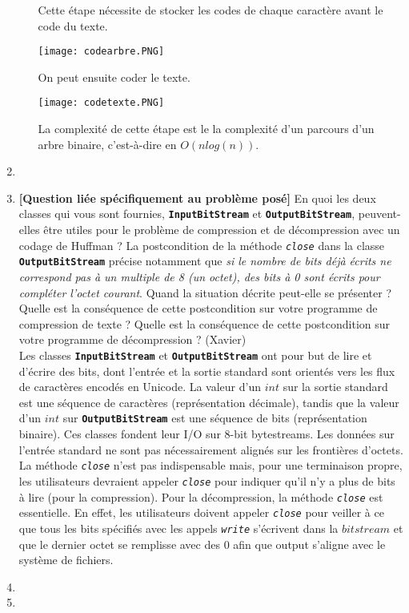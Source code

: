 \documentclass[11pt]{article}
\begin{document}
\begin{enumerate}
\begin{enumerate}
\begin{center}
\end{center}
Cette étape nécessite de stocker les codes de chaque caractère avant le code du texte.
\begin{center}
    \texttt{[image: codearbre.PNG]}
\end{center}
On peut ensuite coder le texte.
\begin{center}
    \texttt{[image: codetexte.PNG]}
\end{center}
La complexité de cette étape est le la complexité d'un parcours d'un arbre binaire, c'est-à-dire en $O(n log(n))$.\\
\end{enumerate}

\item

\item \textbf{[Question liée spécifiquement au problème posé]} En quoi les deux classes qui
vous sont fournies, \texttt{\textbf{InputBitStream}} et \texttt{\textbf{OutputBitStream}}, peuvent-elles
être utiles pour le problème de compression et de décompression avec un codage
de Huffman ? La postcondition de la méthode \texttt{\textit{close}} dans la classe \texttt{\textbf{OutputBitStream}}
précise notamment que \textit{si le nombre de bits déjà écrits ne correspond pas à un
multiple de 8 (un octet), des bits à 0 sont écrits pour compléter l’octet courant}.
Quand la situation décrite peut-elle se présenter ? Quelle est la conséquence de
cette postcondition sur votre programme de compression de texte ? Quelle est la
conséquence de cette postcondition sur votre programme de décompression ? (Xavier)\\

Les classes \texttt{\textbf{InputBitStream}} et \texttt{\textbf{OutputBitStream}} ont pour but de lire et d'écrire des bits, dont l'entrée et la sortie standard sont orientés vers les flux de caractères encodés en Unicode. La valeur d'un $int$ sur la sortie standard est une séquence de caractères (représentation décimale), tandis que la valeur d'un $int$ sur \texttt{\textbf{OutputBitStream}} est une séquence de bits (représentation binaire). Ces classes  fondent leur I/O sur 8-bit bytestreams. Les données sur l'entrée standard ne sont pas nécessairement alignés sur les frontières d'octets. La méthode \texttt{\textit{close}} n'est pas indispensable mais, pour une terminaison propre, les utilisateurs devraient appeler \texttt{\textit{close}} pour indiquer qu'il n'y a plus de bits à lire (pour la compression). Pour la décompression, la méthode \texttt{\textit{close}} est essentielle. En effet, les utilisateurs doivent appeler \texttt{\textit{close}} pour veiller à ce que tous les bits spécifiés avec les appels \texttt{\textit{write}} s'écrivent dans la $bitstream$ et que le dernier octet se remplisse avec des 0 afin que output s'aligne avec le système de fichiers.\\

\item
\item

\end{enumerate}
\end{document}

